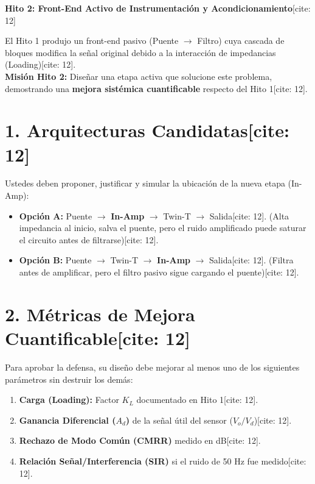 \documentclass[11pt, a4paper]{article}
\begin{document}
\begin{center}
    \Large\textbf{\textcolor{ucbblue}{Hito 2: Front-End Activo de Instrumentación y Acondicionamiento}}[cite: 12]
\end{center}

\begin{tcolorbox}[colback=yellow!5, colframe=ucbblue, title=\textbf{Definición del Problema}]
    El Hito 1 produjo un front-end pasivo (Puente $\rightarrow$ Filtro) cuya cascada de bloques modifica la señal original debido a la interacción de impedancias (Loading)[cite: 12]. \\
    \textbf{Misión Hito 2:} Diseñar una etapa activa que solucione este problema, demostrando una \textbf{mejora sistémica cuantificable} respecto del Hito 1[cite: 12].
\end{tcolorbox}

\section*{1. Arquitecturas Candidatas[cite: 12]}
Ustedes deben proponer, justificar y simular la ubicación de la nueva etapa (In-Amp):
\begin{itemize}
    \item \textbf{Opción A:} Puente $\rightarrow$ \textbf{In-Amp} $\rightarrow$ Twin-T $\rightarrow$ Salida[cite: 12]. (Alta impedancia al inicio, salva el puente, pero el ruido amplificado puede saturar el circuito antes de filtrarse)[cite: 12].
    \item \textbf{Opción B:} Puente $\rightarrow$ Twin-T $\rightarrow$ \textbf{In-Amp} $\rightarrow$ Salida[cite: 12]. (Filtra antes de amplificar, pero el filtro pasivo sigue cargando el puente)[cite: 12].
\end{itemize}

\section*{2. Métricas de Mejora Cuantificable[cite: 12]}
Para aprobar la defensa, su diseño debe mejorar al menos uno de los siguientes parámetros sin destruir los demás:
\begin{enumerate}
    \item \textbf{Carga (Loading):} Factor $K_L$ documentado en Hito 1[cite: 12].
    \item \textbf{Ganancia Diferencial ($A_d$)} de la señal útil del sensor ($V_o / V_d$)[cite: 12].
    \item \textbf{Rechazo de Modo Común (CMRR)} medido en dB[cite: 12].
    \item \textbf{Relación Señal/Interferencia (SIR)} si el ruido de 50 Hz fue medido[cite: 12].
\end{enumerate}
\end{document}
